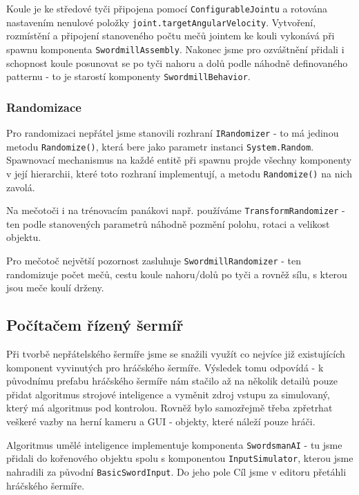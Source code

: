 Koule je ke středové tyči připojena pomocí \texttt{ConfigurableJointu} a rotována nastavením nenulové položky \texttt{joint.targetAngularVelocity}. Vytvoření, rozmístění a připojení stanoveného počtu mečů jointem ke kouli vykonává při spawnu komponenta \texttt{SwordmillAssembly}. Nakonec jsme pro ozváštnění přidali i schopnost koule posunovat se po tyči nahoru a dolů podle náhodně definovaného patternu - to je starostí komponenty \texttt{SwordmillBehavior}.

\subsubsection*{Randomizace}

Pro randomizaci nepřátel jsme stanovili rozhraní \texttt{IRandomizer} - to má jedinou metodu \texttt{Randomize()}, která bere jako parametr instanci \texttt{System.Random}. Spawnovací mechanismus na každé entitě při spawnu projde všechny komponenty v její hierarchii, které toto rozhraní implementují, a metodu \texttt{Randomize()} na nich zavolá.

Na mečotoči i na trénovacím panákovi např. používáme \texttt{TransformRandomizer} - ten podle stanovených parametrů náhodně pozmění polohu, rotaci a velikost objektu.

Pro mečotoč největší pozornost zasluhuje \texttt{SwordmillRandomizer} - ten randomizuje počet mečů, cestu koule nahoru/dolů po tyči a rovněž sílu, s kterou jsou meče koulí drženy.


\subsection{Počítačem řízený šermíř} \label{knightEnemySubsection}

Při tvorbě nepřátelského šermíře jsme se snažili využít co nejvíce již existujících komponent vyvinutých pro hráčského šermíře. Výsledek tomu odpovídá - k původnímu prefabu hráčského šermíře nám stačilo až na několik detailů pouze přidat algoritmus strojové inteligence a vyměnit zdroj vstupu za simulovaný, který má algoritmus pod kontrolou. Rovněž bylo samozřejmě třeba zpřetrhat veškeré vazby na herní kameru a GUI - objekty, které náleží pouze hráči.

Algoritmus umělé inteligence implementuje komponenta \texttt{SwordsmanAI} - tu jsme přidali do kořenového objektu spolu s komponentou \texttt{InputSimulator}, kterou jsme nahradili za původní \texttt{BasicSwordInput}. Do jeho pole Cíl jsme v editoru přetáhli hráčského šermíře.


